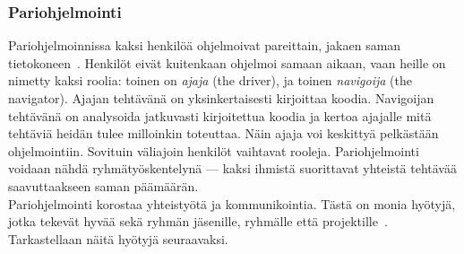 \documentclass[finnish]{../tktltiki2}
\theoremstyle{definition}
\theoremstyle{remark}
\begin{document}
\subsubsection{Pariohjelmointi}

Pariohjelmoinnissa kaksi henkilöä ohjelmoivat pareittain, jakaen saman 
tietokoneen~\cite{Shore:2007:AAD:1407480}. Henkilöt eivät kuitenkaan ohjelmoi samaan aikaan, vaan 
heille on 
nimetty kaksi roolia: toinen on \emph{ajaja} (the driver), ja toinen 
\emph{navigoija} (the navigator). Ajajan tehtävänä on 
yksinkertaisesti 
kirjoittaa koodia. Navigoijan tehtävänä on analysoida jatkuvasti 
kirjoitettua koodia ja kertoa ajajalle mitä tehtäviä heidän tulee 
milloinkin 
toteuttaa. Näin ajaja voi keskittyä pelkästään ohjelmointiin. Sovituin 
väliajoin henkilöt vaihtavat rooleja. Pariohjelmointi voidaan nähdä 
ryhmätyöskentelynä --- kaksi ihmistä suorittavat yhteistä tehtävää 
saavuttaakseen saman päämäärän.\\

Pariohjelmointi korostaa yhteistyötä ja kommunikointia. Tästä on monia 
hyötyjä, jotka tekevät hyvää sekä ryhmän jäsenille, ryhmälle että 
projektille~\cite{Begel:2008:PPW:1414004.1414026}. Tarkastellaan näitä 
hyötyjä seuraavaksi. 
\end{document}
